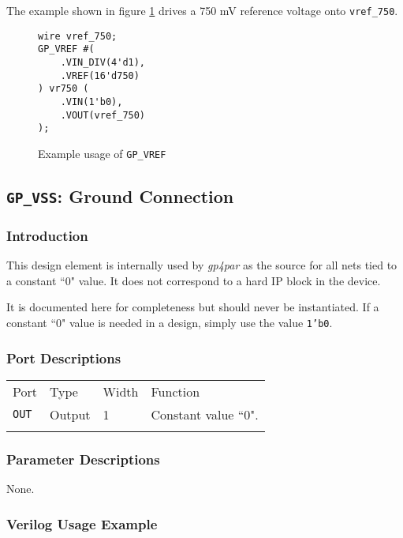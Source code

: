\documentclass[11pt]{article}
\newcommand{\namestyle}[1]{\textit{#1}}
\newcommand{\tokenstyle}[1]{\texttt{#1}}
\newcommand{\wirestyle}[1]{\texttt{#1}}
\newcommand{\datastyle}[1]{\texttt{#1}}
\newcommand{\whenstyle}[1]{{\fontseries{sb}\selectfont#1}}
\newcommand{\thinhline}{\Xhline{1\arrayrulewidth}}
\newcommand{\thickhline}{\Xhline{2.5\arrayrulewidth}}
\begin{document}
The example shown in figure \ref{gp-vref-example} drives a 750 mV reference voltage onto \wirestyle{vref\_750}.

\begin{figure}[h]
\begin{lstlisting}
wire vref_750;
GP_VREF #(
	.VIN_DIV(4'd1),
	.VREF(16'd750)
) vr750 (
	.VIN(1'b0),
	.VOUT(vref_750)
);
\end{lstlisting}
\caption{Example usage of \tokenstyle{GP\_VREF}}
\label{gp-vref-example}
\end{figure}


\clearpage
\pagebreak
\subsection{\tokenstyle{GP\_VSS}: Ground Connection}

\subsubsection{Introduction}
This design element is internally used by \namestyle{gp4par} as the source for all nets tied to a constant ``0" value. It does not correspond to a hard IP block in the device.

It is documented here for completeness but should never be instantiated. If a constant ``0" value is needed in a
design, simply use the value \datastyle{1'b0}.

\subsubsection{Port Descriptions}

\begin{tabularx}{\textwidth}{lllX}
\thinhline
\whenstyle{Port} & \whenstyle{Type} & \whenstyle{Width} & \whenstyle{Function} \\
\thickhline
\tokenstyle{OUT} & Output & 1 & Constant value ``0". \\
\thinhline
\end{tabularx}

\subsubsection{Parameter Descriptions}

None.

\subsubsection{Verilog Usage Example}
\end{document}
